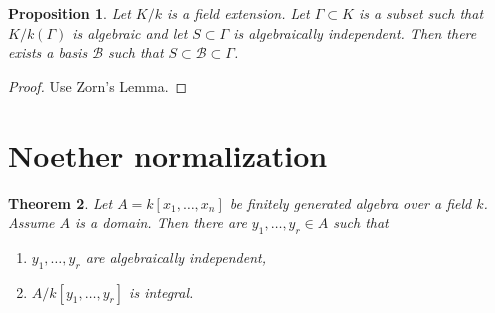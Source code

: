 \documentclass[12pt]{report}
\theoremstyle{plain}
\newtheorem{theorem}{Theorem}[section]
\newtheorem{proposition}[theorem]{Proposition}
\theoremstyle{remark}
\theoremstyle{definition}
\begin{document}
\begin{proposition}
    Let $K/k$ is a field extension. Let $\Gamma\subset K$ is a subset such that $K/k(\Gamma)$ is algebraic and let $S\subset \Gamma$ is algebraically independent. Then there exists a basis $\mathcal{B}$ such that $S\subset \mathcal{B}\subset \Gamma$.
\end{proposition}
\begin{proof}
    Use Zorn's Lemma.
\end{proof}


\clearpage
\section{Noether normalization}
\begin{theorem}
    Let $A=k[x_1,\dots,x_n]$ be finitely generated algebra over a field $k$. Assume $A$ is a domain. Then there are $y_1,\dots,y_r\in A$ such that
    \begin{enumerate}
        \item $y_1,\dots,y_r$ are algebraically independent,
        \item $A/k[y_1,\dots,y_r]$ is integral.
    \end{enumerate}
\end{theorem}
\end{document}
